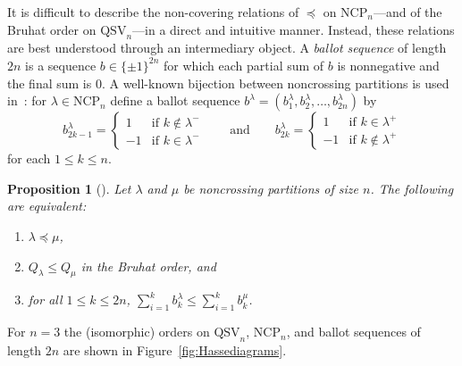 \documentclass[submission]{FPSAC2024}
\newtheorem{prop}[equation]{Proposition}
\theoremstyle{definition}
\theoremstyle{remark}
\numberwithin{equation}{section}
\newcommand{\QSV}{\mathrm{QSV}}
\newcommand{\NCP}{\mathrm{NCP}}
\begin{document}
It is difficult to describe the non-covering relations of $\preceq$ on $\NCP_{n}$---and of the Bruhat order on $\QSV_{n}$---in a direct and intuitive manner.  Instead, these relations are best understood through an intermediary object.  A \emph{ballot sequence} of length $2n$ is a sequence $b \in \{\pm1\}^{2n}$ for which each partial sum of $b$ is nonnegative and the final sum is $0$.  A well-known bijection between noncrossing partitions is used in~\cite[Section~5.1]{GW16}: for $\lambda \in \NCP_{n}$ define a ballot sequence $b^{\lambda} = (b^{\lambda}_{1}, b^{\lambda}_{2}, \ldots, b^{\lambda}_{2n})$  by
\[
b^{\lambda}_{2 k - 1} = \begin{cases} 1 & \text{if $k \notin \lambda^{-}$} \\ -1 & \text{if $k \in \lambda^{-}$} \end{cases}
\qquad
\text{and}
\qquad
b^{\lambda}_{2 k} = \begin{cases} 1 & \text{if $k \in \lambda^{+}$} \\ -1 & \text{if $k \notin \lambda^{+}$} \end{cases}
\]
for each $1 \le k \le n$.

\begin{prop}[{\cite[Theorem 1.1 and Corollary 7.5]{GW16}}]
\label{prop:QSVorderbijection}
Let $\lambda$ and $\mu$ be noncrossing partitions of size $n$.  The following are equivalent:
\begin{enumerate}[itemsep =1ex]
\item $\lambda \preceq \mu$, 

\item $Q_{\lambda} \le Q_{\mu}$ in the Bruhat order, and

\item for all $1 \le k \le 2n$, $\sum_{i = 1}^{k} b^{\lambda}_{k} \le \sum_{i = 1}^{k} b^{\mu}_{k}$.

\end{enumerate}
\end{prop}

For $n = 3$ the (isomorphic) orders on $\QSV_{n}$, $\NCP_{n}$, and ballot sequences of length $2n$ are shown in Figure~\ref{fig:Hassediagrams}.
\end{document}
